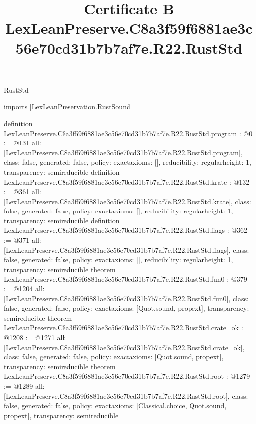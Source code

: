 \begin{lexlean}{RustStd}
\title{Certificate B LexLeanPreserve.C8a3f59f6881ae3c56e70cd31b7b7af7e.R22.RustStd}
\begin{coremodule}
imports [LexLeanPreservation.RustSound]

definition LexLeanPreserve.C8a3f59f6881ae3c56e70cd31b7b7af7e.R22.RustStd.program : @0 := @131 {
  all: [LexLeanPreserve.C8a3f59f6881ae3c56e70cd31b7b7af7e.R22.RustStd.program],
  class: false,
  generated: false,
  policy: exact{axioms: []},
  reducibility: regular{height: 1},
  transparency: semireducible
}
definition LexLeanPreserve.C8a3f59f6881ae3c56e70cd31b7b7af7e.R22.RustStd.krate : @132 := @361 {
  all: [LexLeanPreserve.C8a3f59f6881ae3c56e70cd31b7b7af7e.R22.RustStd.krate],
  class: false,
  generated: false,
  policy: exact{axioms: []},
  reducibility: regular{height: 1},
  transparency: semireducible
}
definition LexLeanPreserve.C8a3f59f6881ae3c56e70cd31b7b7af7e.R22.RustStd.flags : @362 := @371 {
  all: [LexLeanPreserve.C8a3f59f6881ae3c56e70cd31b7b7af7e.R22.RustStd.flags],
  class: false,
  generated: false,
  policy: exact{axioms: []},
  reducibility: regular{height: 1},
  transparency: semireducible
}
theorem LexLeanPreserve.C8a3f59f6881ae3c56e70cd31b7b7af7e.R22.RustStd.fun0 : @379 := @1204 {
  all: [LexLeanPreserve.C8a3f59f6881ae3c56e70cd31b7b7af7e.R22.RustStd.fun0],
  class: false,
  generated: false,
  policy: exact{axioms: [Quot.sound, propext]},
  transparency: semireducible
}
theorem LexLeanPreserve.C8a3f59f6881ae3c56e70cd31b7b7af7e.R22.RustStd.crate_ok : @1208 := @1271 {
  all: [LexLeanPreserve.C8a3f59f6881ae3c56e70cd31b7b7af7e.R22.RustStd.crate_ok],
  class: false,
  generated: false,
  policy: exact{axioms: [Quot.sound, propext]},
  transparency: semireducible
}
theorem LexLeanPreserve.C8a3f59f6881ae3c56e70cd31b7b7af7e.R22.RustStd.root : @1279 := @1289 {
  all: [LexLeanPreserve.C8a3f59f6881ae3c56e70cd31b7b7af7e.R22.RustStd.root],
  class: false,
  generated: false,
  policy: exact{axioms: [Classical.choice, Quot.sound, propext]},
  transparency: semireducible
}


\end{coremodule}
\end{lexlean}
